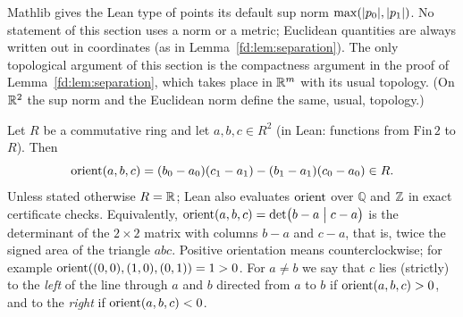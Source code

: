 \begin{remark}\label{fd:rem:norm}
Mathlib gives the Lean type of points its default sup norm $\max(\lvert p_0\rvert,\lvert p_1\rvert)$. No statement of
this section uses a norm or a metric; Euclidean quantities are always written out in coordinates (as in
Lemma~\ref{fd:lem:separation}). The only topological argument of this section is the compactness
argument in the proof of Lemma~\ref{fd:lem:separation}, which takes place in $\mathbb R^m$ with its usual
topology. (On $\mathbb R^2$ the sup norm and the Euclidean norm define the same, usual, topology.)
\end{remark}

\begin{definition}\label{fd:def:orient}\sloppy
Let $R$ be a commutative ring and let $a,b,c\in R^2$ (in Lean: functions from $\mathrm{Fin}\,2$ to
$R$). Then
\[
  \operatorname{orient}(a,b,c)=(b_0-a_0)(c_1-a_1)-(b_1-a_1)(c_0-a_0)\in R .
\]
Unless stated otherwise $R=\mathbb R$; Lean also evaluates $\operatorname{orient}$ over $\mathbb{Q}$ and $\mathbb Z$ in exact
certificate checks. Equivalently, $\operatorname{orient}(a,b,c)=\det\bigl(b-a\;\big|\;c-a\bigr)$ is the determinant of
the $2\times2$ matrix with columns $b-a$ and $c-a$, that is, twice the signed area of the triangle $abc$.
Positive orientation means counterclockwise; for example $\operatorname{orient}((0,0),(1,0),(0,1))=1>0$. For $a\ne b$
we say that $c$ lies (strictly) to the \emph{left} of the line through $a$ and $b$ directed from $a$ to
$b$ if $\operatorname{orient}(a,b,c)>0$, and to the \emph{right} if $\operatorname{orient}(a,b,c)<0$.
\end{definition}

